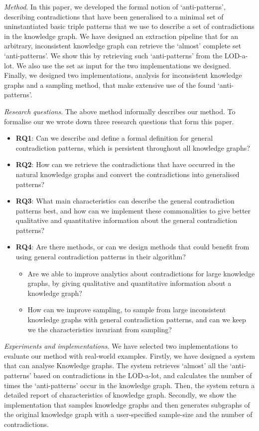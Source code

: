\documentclass{article}
\begin{document}
\textit{Method}. In this paper, we developed the formal notion of `anti-patterns', describing contradictions that have been generalised to a minimal set of uninstantiated basic triple patterns that we use to describe a set of contradictions in the knowledge graph. We have designed an extraction pipeline that for an arbitrary, inconsistent knowledge graph can retrieve the `almost' complete set `anti-patterns'. We show this by retrieving such `anti-patterns' from the LOD-a-lot\cite{JavierD:2017}. We also use the set as input for the two implementations we designed. Finally, we designed two implementations, analysis for inconsistent knowledge graphs and a sampling method, that make extensive use of the found `anti-patterns'. 

\textit{Research questions}. The above method informally describes our method. To formalise our we wrote down three research questions that form this paper.

\begin{itemize}
	\item \textbf{RQ1}: Can we describe and define a formal definition for general contradiction patterns, which is persistent throughout all knowledge graphs?
	\item \textbf{RQ2}: How can we retrieve the contradictions that have occurred in the natural knowledge graphs and convert the contradictions into generalised patterns?
	\item \textbf{RQ3}: What main characteristics can describe the general contradiction patterns best, and how can we implement these commonalities to give better qualitative and quantitative information about the general contradiction patterns?
	\item \textbf{RQ4}: Are there methods, or can we design methods that could benefit from using general contradiction patterns in their algorithm? 
	\begin{itemize}
		\item Are we able to improve analytics about contradictions for large knowledge graphs, by giving qualitative and quantitative information about a knowledge graph?
		\item How can we improve sampling, to sample from large inconsistent knowledge graphs with general contradiction patterns, and can we keep we the characteristics invariant from sampling? %
	\end{itemize}
\end{itemize}

\textit{Experiments and implementations}. We have selected two implementations to evaluate our method with real-world examples. Firstly, we have designed a system that can analyse Knowledge graphs. The system retrieves `almost' all the  `anti-patterns' based on contradictions in the LOD-a-lot, and calculates the number of times the `anti-patterns' occur in the knowledge graph. Then, the system return a detailed report of characteristics of knowledge graph.
Secondly, we show the implementation that samples knowledge graphs and then generates subgraphs of the original knowledge graph with a user-specified sample-size and the number of contradictions. 
\end{document}
